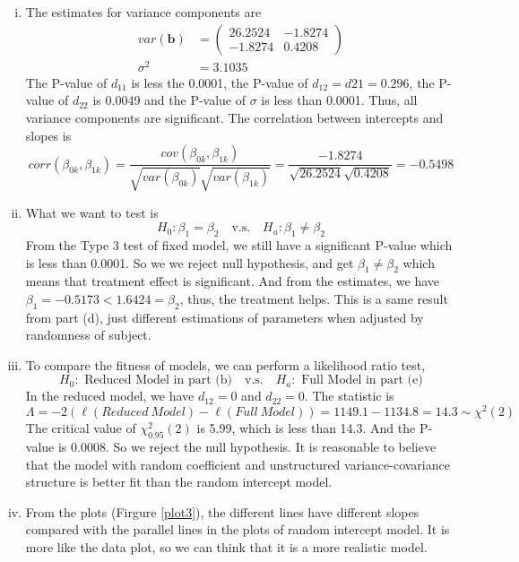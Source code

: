 \documentclass[letterpaper, 12pt]{article}
\newcommand{\ba}{$$\begin{aligned}}
\newcommand{\ea}{\end{aligned}$$}
\newcommand{\lma}{\left(\begin{matrix}}
\newcommand{\rma}{\end{matrix}\right)}
\begin{document}
\begin{enumerate}[i.]
\item The estimates for variance components are
\ba
var(\bm{b})&=\lma 26.2524&-1.8274\\-1.8274&0.4208\rma\\
\sigma^2&=3.1035
\ea
The P-value of $d_{11}$ is less the 0.0001, the P-value of $d_{12}=d{21}=0.296$, the P-value of $d_{22}$ is 0.0049 and the P-value of $\sigma$ is less than 0.0001. Thus, all variance components are significant. The correlation between intercepts and slopes is
$$
corr(\beta_{0k},\beta_{1k})=\frac{cov(\beta_{0k},\beta_{1k})}{\sqrt{var(\beta_{0k})}\sqrt{var(\beta_{1k})}}=\frac{-1.8274}{\sqrt{26.2524}\sqrt{0.4208}}=-0.5498
$$

\item What we want to test is
$$
H_0:\beta_1=\beta_2\quad\text{v.s.}\quad H_a: \beta_1\not=\beta_2
$$
From the Type 3 test of fixed model, we still have a significant P-value which is less than 0.0001. So we we reject null hypothesis, and get $\beta_1\not=\beta_2$ which means that treatment effect is significant. And from the estimates, we have $\beta_1=-0.5173<1.6424=\beta_2$, thus, the treatment helps. This is a same result from part (d), just different estimations of parameters when adjusted by randomness of subject.

\item To compare the fitness of models, we can perform a likelihood ratio test,
$$
H_0:\text{ Reduced Model in part (b)}\quad\text{v.s.}\quad H_a:\text{ Full Model in part (e)}
$$
In the reduced model, we have $d_{12}=0$ and $d_{22}=0$.
The statistic is 
$$
\Lambda=-2(\ell(Reduced~Model)-\ell(Full~Model))=1149.1-1134.8=14.3\sim\chi^2(2)
$$
The critical value of $\chi^2_{0.95}(2)$ is 5.99, which is less than 14.3. And the P-value is 0.0008. So we reject the null hypothesis. It is reasonable to believe that the model with random coefficient and unstructured variance-covariance structure is better fit than the random intercept model.
\item From the plots (Firgure \ref{plot3}), the different lines have different slopes compared with the parallel lines in the plots of random intercept model. It is more like the data plot, so we can think that it is a more realistic model.
\end{enumerate}
\end{document}
